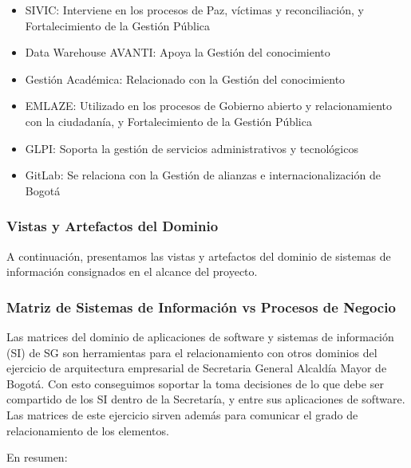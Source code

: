 \documentclass[
	a4paper, %
	12pt, %
]{include/CSSullivanBusinessReport}
\begin{document}
\begin{itemize}
\item
  SIVIC: Interviene en los procesos de Paz, víctimas y reconciliación, y
  Fortalecimiento de la Gestión Pública
\item
  Data Warehouse AVANTI: Apoya la Gestión del conocimiento
\item
  Gestión Académica: Relacionado con la Gestión del conocimiento
\item
  EMLAZE: Utilizado en los procesos de Gobierno abierto y
  relacionamiento con la ciudadanía, y Fortalecimiento de la Gestión
  Pública
\item
  GLPI: Soporta la gestión de servicios administrativos y tecnológicos
\item
  GitLab: Se relaciona con la Gestión de alianzas e internacionalización
  de Bogotá
\end{itemize}

\subsubsection{Vistas y Artefactos del
Dominio}\label{sec:vistas-y-artefactos-del-dominio}

A continuación, presentamos las vistas y artefactos del dominio de
sistemas de información consignados en el alcance del proyecto.

\subsubsection{Matriz de Sistemas de Información vs Procesos de
Negocio}\label{sec:matriz-de-sistemas-de-informaciuxf3n-vs-procesos-de-negocio}

Las matrices del dominio de aplicaciones de software y sistemas de
información (SI) de SG son herramientas para el relacionamiento con
otros dominios del ejercicio de arquitectura empresarial de Secretaria
General Alcaldía Mayor de Bogotá. Con esto conseguimos soportar la toma
decisiones de lo que debe ser compartido de los SI dentro de la
Secretaría, y entre sus aplicaciones de software. Las matrices de este
ejercicio sirven además para comunicar el grado de relacionamiento de
los elementos.

En resumen:
\end{document}
